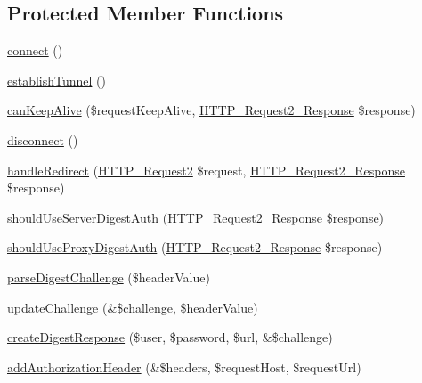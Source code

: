 \subsection*{Protected Member Functions}
\begin{DoxyCompactItemize}
\item 
\hyperlink{classHTTP__Request2__Adapter__Socket_a84b2a17c74b0dc0eb8ac7403adbeffc9}{connect} ()
\item 
\hyperlink{classHTTP__Request2__Adapter__Socket_a924bbeb198c174580c109eb563079296}{establish\-Tunnel} ()
\item 
\hyperlink{classHTTP__Request2__Adapter__Socket_a5171c1e7af2244777b09a8078ed5c667}{can\-Keep\-Alive} (\$request\-Keep\-Alive, \hyperlink{classHTTP__Request2__Response}{H\-T\-T\-P\-\_\-\-Request2\-\_\-\-Response} \$response)
\item 
\hyperlink{classHTTP__Request2__Adapter__Socket_a20cf7acb1fb9f0f80929ec368fc4ff8f}{disconnect} ()
\item 
\hyperlink{classHTTP__Request2__Adapter__Socket_aa60407169d7f2faee49d32a6d48d1f3e}{handle\-Redirect} (\hyperlink{classHTTP__Request2}{H\-T\-T\-P\-\_\-\-Request2} \$request, \hyperlink{classHTTP__Request2__Response}{H\-T\-T\-P\-\_\-\-Request2\-\_\-\-Response} \$response)
\item 
\hyperlink{classHTTP__Request2__Adapter__Socket_a3d9def9a7ef3725d00b81fa224eedeb3}{should\-Use\-Server\-Digest\-Auth} (\hyperlink{classHTTP__Request2__Response}{H\-T\-T\-P\-\_\-\-Request2\-\_\-\-Response} \$response)
\item 
\hyperlink{classHTTP__Request2__Adapter__Socket_af26e1fe3de20a109ff76fbadab10ec28}{should\-Use\-Proxy\-Digest\-Auth} (\hyperlink{classHTTP__Request2__Response}{H\-T\-T\-P\-\_\-\-Request2\-\_\-\-Response} \$response)
\item 
\hyperlink{classHTTP__Request2__Adapter__Socket_a271d3c7e7ce64e2acc6f560187c8a7cb}{parse\-Digest\-Challenge} (\$header\-Value)
\item 
\hyperlink{classHTTP__Request2__Adapter__Socket_abe6b620d64a56d799cd9367aedf3c0e6}{update\-Challenge} (\&\$challenge, \$header\-Value)
\item 
\hyperlink{classHTTP__Request2__Adapter__Socket_a8eeccb83fca751fd43b3035e31243940}{create\-Digest\-Response} (\$user, \$password, \$url, \&\$challenge)
\item 
\hyperlink{classHTTP__Request2__Adapter__Socket_af09e76396d487dae2bfc85b789c8f73b}{add\-Authorization\-Header} (\&\$headers, \$request\-Host, \$request\-Url)
\item 

\end{DoxyCompactItemize}
